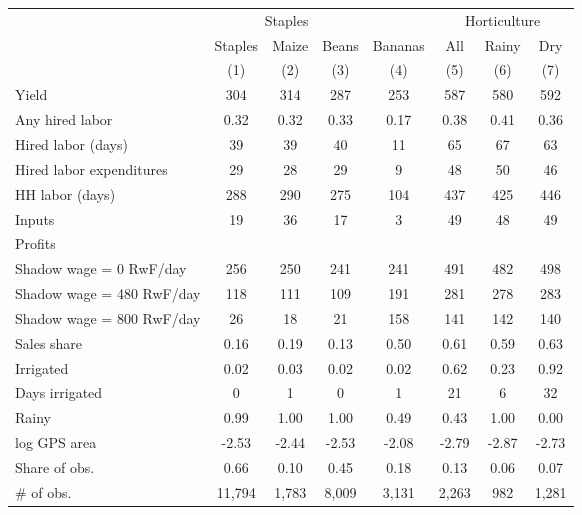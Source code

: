 \begin{tabular}{lccccccc}
\hline \hline
 & \multicolumn{3}{c}{Staples} & & \multicolumn{3}{c}{Horticulture} \\
\cmidrule(lr){2-4}\cmidrule(lr){6-8}
 & Staples & Maize & Beans & Bananas & All & Rainy & Dry \\
 & (1) & (2) & (3) & (4) & (5) & (6) & (7) \\
\hline
Yield & 304 & 314 & 287 & 253 & 587 & 580 & 592 \\
Any hired labor & \hphantom{0}0.32 & \hphantom{0}0.32 & \hphantom{0}0.33 & \hphantom{0}0.17 & \hphantom{0}0.38 & \hphantom{0}0.41 & \hphantom{0}0.36 \\
Hired labor (days) & \hphantom{0}39 & \hphantom{0}39 & \hphantom{0}40 & \hphantom{0}11 & \hphantom{0}65 & \hphantom{0}67 & \hphantom{0}63 \\
Hired labor expenditures & \hphantom{0}29 & \hphantom{0}28 & \hphantom{0}29 & \hphantom{0}\hphantom{0}9 & \hphantom{0}48 & \hphantom{0}50 & \hphantom{0}46 \\
HH labor (days) & 288 & 290 & 275 & 104 & 437 & 425 & 446 \\
Inputs & \hphantom{0}19 & \hphantom{0}36 & \hphantom{0}17 & \hphantom{0}\hphantom{0}3 & \hphantom{0}49 & \hphantom{0}48 & \hphantom{0}49 \\
Profits & & & & & & & \\
\hspace{0.5em}Shadow wage = 0 RwF/day & 256 & 250 & 241 & 241 & 491 & 482 & 498 \\
\hspace{0.5em}Shadow wage = 480 RwF/day & 118 & 111 & 109 & 191 & 281 & 278 & 283 \\
\hspace{0.5em}Shadow wage = 800 RwF/day & \hphantom{0}26 & \hphantom{0}18 & \hphantom{0}21 & 158 & 141 & 142 & 140 \\
Sales share & \hphantom{0}0.16 & \hphantom{0}0.19 & \hphantom{0}0.13 & \hphantom{0}0.50 & \hphantom{0}0.61 & \hphantom{0}0.59 & \hphantom{0}0.63 \\
Irrigated & \hphantom{0}0.02 & \hphantom{0}0.03 & \hphantom{0}0.02 & \hphantom{0}0.02 & \hphantom{0}0.62 & \hphantom{0}0.23 & \hphantom{0}0.92 \\
Days irrigated & \hphantom{0}\hphantom{0}0 & \hphantom{0}\hphantom{0}1 & \hphantom{0}\hphantom{0}0 & \hphantom{0}\hphantom{0}1 & \hphantom{0}21 & \hphantom{0}\hphantom{0}6 & \hphantom{0}32 \\
Rainy & \hphantom{0}0.99 & \hphantom{0}1.00 & \hphantom{0}1.00 & \hphantom{0}0.49 & \hphantom{0}0.43 & \hphantom{0}1.00 & \hphantom{0}0.00 \\
log GPS area & -2.53 & -2.44 & -2.53 & -2.08 & -2.79 & -2.87 & -2.73 \\
Share of obs. & \hphantom{0}0.66 & \hphantom{0}0.10 & \hphantom{0}0.45 & \hphantom{0}0.18 & \hphantom{0}0.13 & \hphantom{0}0.06 & \hphantom{0}0.07 \\
\# of obs. & 11,794 & 1,783 & 8,009 & 3,131 & 2,263 & 982 & 1,281 \\
\hline \hline
\end{tabular}
